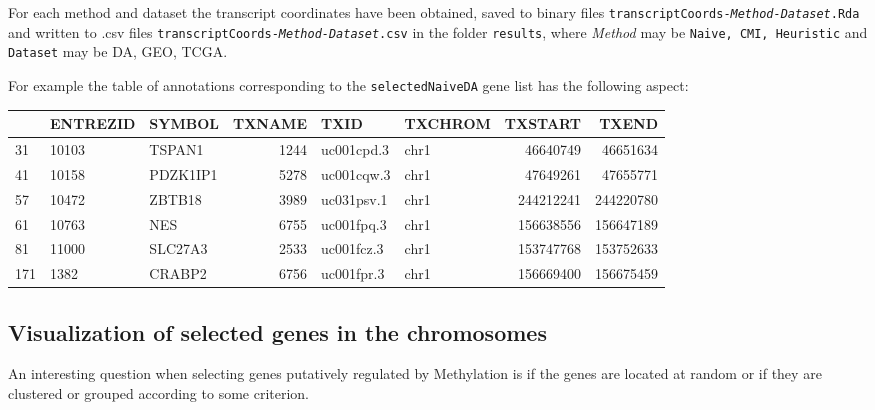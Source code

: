 \documentclass[a4paper,10pt]{article}\usepackage[]{graphicx}\usepackage[]{color}
\newenvironment{knitrout}{}{} %
\begin{document}
For each method and dataset the transcript coordinates have been obtained, saved to binary files \texttt{transcriptCoords-\emph{Method-Dataset}.Rda} and written to .csv files \texttt{transcriptCoords-\emph{Method-Dataset}.csv} in the folder \texttt{results}, where \emph{Method} may be \texttt{Naive, CMI, Heuristic} and \texttt{Dataset} may be {DA, GEO, TCGA}.



For example the table of annotations corresponding to the \texttt{selectedNaiveDA} gene list has the following aspect:

\begin{knitrout}
\color{fgcolor}


\begin{tabular}{l|l|l|r|l|l|r|r}
\hline
  & ENTREZID & SYMBOL & TXNAME & TXID & TXCHROM & TXSTART & TXEND\\
\hline
31 & 10103 & TSPAN1 & 1244 & uc001cpd.3 & chr1 & 46640749 & 46651634\\
\hline
41 & 10158 & PDZK1IP1 & 5278 & uc001cqw.3 & chr1 & 47649261 & 47655771\\
\hline
57 & 10472 & ZBTB18 & 3989 & uc031psv.1 & chr1 & 244212241 & 244220780\\
\hline
61 & 10763 & NES & 6755 & uc001fpq.3 & chr1 & 156638556 & 156647189\\
\hline
81 & 11000 & SLC27A3 & 2533 & uc001fcz.3 & chr1 & 153747768 & 153752633\\
\hline
171 & 1382 & CRABP2 & 6756 & uc001fpr.3 & chr1 & 156669400 & 156675459\\
\hline
\end{tabular}
\end{knitrout}


\subsection{Visualization of selected genes in the chromosomes}

An interesting question when selecting genes putatively regulated by Methylation is if the genes are located at random or if they are clustered or grouped according to some criterion.
\end{document}

